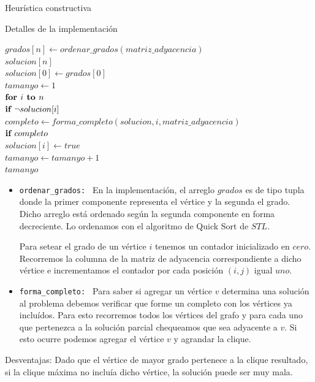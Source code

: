 \begin{section}{Heurística constructiva}
\begin{subsection}{Detalles de la implementación}
			\begin{pseudo}
				\tab $grados[n] \leftarrow ordenar\_grados(matriz\_adyacencia)$\\
				\tab $solucion[n]$\\
				\tab $solucion[0] \leftarrow grados[0]$\\
				\tab $tamanyo \leftarrow 1$\\
				\tab $\textbf{for } i \textbf{ to } n$\\
				\tab \tab $\textbf{if } \neg solucion[i]$\\
				\tab \tab \tab $completo \leftarrow forma\_completo(solucion,i,matriz\_adyacencia)$\\
				\tab \tab \tab $\textbf{if } completo$\\
				\tab \tab \tab \tab $solucion[i] \leftarrow true$\\
				\tab \tab \tab \tab $tamanyo \leftarrow tamanyo + 1$\\
				\RET $tamanyo$\\
			\end{pseudo}

			\begin{itemize}
				\item \texttt{ordenar\_grados: } En la implementación, el arreglo $grados$ es de tipo tupla donde la primer componente representa el vértice y la segunda el grado. Dicho arreglo está ordenado según la segunda componente en forma decreciente. Lo ordenamos con el algoritmo de Quick Sort de $STL$.
				
				Para setear el grado de un vértice $i$ tenemos un contador inicializado en $cero$. Recorremos la columna de la matriz de adyacencia correspondiente a dicho vértice e incrementamos el contador por cada posición $(i,j)$ igual $uno$.
				\item \texttt{forma\_completo: } Para saber si agregar un vértice $v$ determina una solución al problema debemos verificar que forme un completo con los vértices ya incluídos. Para esto recorremos todos los vértices del grafo y para cada uno que pertenezca a la solución parcial chequeamos que sea adyacente a $v$. Si esto ocurre podemos agregar el vértice $v$ y agrandar la clique.
			\end{itemize}
		\end{subsection}
		\begin{subsection}{Desventajas: }
			Dado que el vértice de mayor grado pertenece a la clique resultado, si la clique máxima no incluía dicho vértice, la solución puede ser muy mala.
			

\end{subsection}
\end{section}
